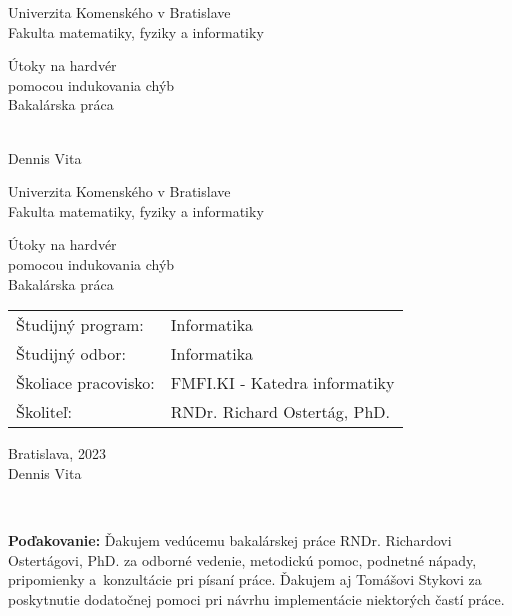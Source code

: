 \documentclass[12pt, twoside]{book}
\def\mfrok{2023}
\def\mfnazov{Útoky na hardvér\\pomocou indukovania chýb}
\def\mftyp{Bakalárska práca}
\def\mfautor{Dennis Vita}
\def\mfskolitel{RNDr. Richard Ostertág, PhD. }
\def\mfmiesto{Bratislava, \mfrok}
\def\mfodbor{ Informatika}
\def\program{ Informatika }
\def\mfpracovisko{ FMFI.KI - Katedra informatiky }
\begin{document}
\frontmatter
\pagestyle{empty}

\begin{center}
\sc\large
Univerzita Komenského v Bratislave\\
Fakulta matematiky, fyziky a informatiky

\vfill

{\LARGE\mfnazov}\\
\mftyp
\end{center}

\vfill

{\sc\large 
\noindent \mfrok\\
\mfautor
}

\cleardoublepage


\noindent

\begin{center}
\sc  
\large
Univerzita Komenského v Bratislave\\
Fakulta matematiky, fyziky a informatiky

\vfill

{\LARGE\mfnazov}\\
\mftyp
\end{center}

\vfill

\noindent
\begin{tabular}{ll}
Študijný program: & \program \\
Študijný odbor: & \mfodbor \\
Školiace pracovisko: & \mfpracovisko \\
Školiteľ: & \mfskolitel \\
\end{tabular}

\vfill


\noindent \mfmiesto\\
\mfautor

\cleardoublepage


\newpage 
\setcounter{page}{2}



\newpage 
\pagestyle{plain}
~

\vfill
{\bf Poďakovanie:} Ďakujem vedúcemu bakalárskej práce RNDr. Richardovi Ostertágovi, PhD. za odborné vedenie, metodickú pomoc, podnetné nápady, pripomienky a~konzultácie pri písaní práce. Ďakujem aj Tomášovi Stykovi za poskytnutie dodatočnej pomoci pri návrhu implementácie niektorých častí práce.\\
\end{document}
